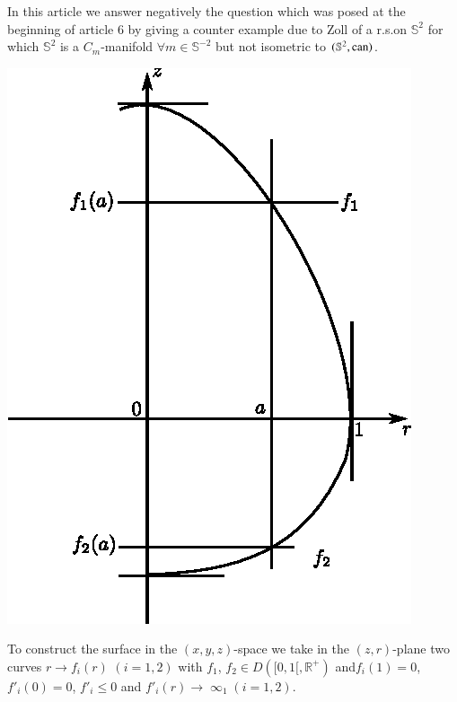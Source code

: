 \quad 
In this article we answer negatively the question which was posed at
the beginning of article $6$ by giving a counter example due to Zoll
of a r.s.\@ on $\mathbb{S}^{2}$ for which $\mathbb{S}^{2}$ is a
$C_{m}$-manifold $\forall m\in\mathbb{S}^{-2}$ but not isometric to
$(\mathbb{S}^{2},\operatorname{can})$.
\begin{center}
\centering
\includegraphics{chap4-fig3.eps}
\end{center}

\noindent
To construct the surface in the $(x,y,z)$-space we take in the
$(z,r)$-plane two curves $r\to f_{i}(r)$ $(i=1,2)$ with $f_{1}$,
$f_{2}\in D([0,1[,\mathbb{R}^{+})$ and\pageoriginale $f_{i}(1)=0$,
    $f'_{i}(0)=0$, $f'_{i}\leq 0$ and $f'_{i}(r)\to
    {\displaystyle{\mathop{\infty}_{1}}}(i=1,2)$.  


